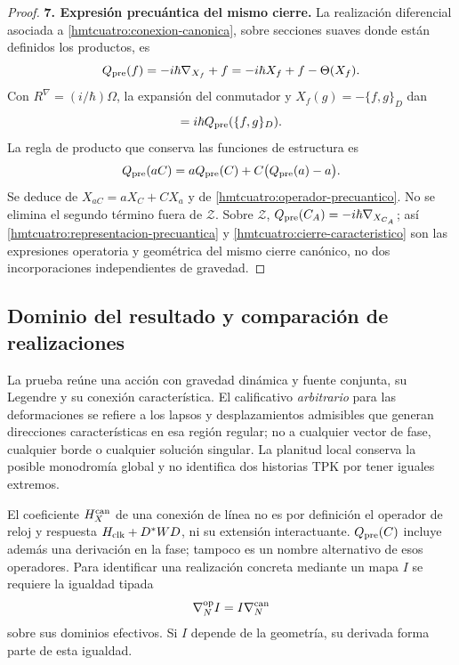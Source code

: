 \begin{proof}
\par\medskip\noindent\textbf{7. Expresión precuántica del mismo cierre.}\quad
La realización diferencial asociada a
\eqref{hmtcuatro:conexion-canonica}, sobre secciones suaves donde
están definidos los productos, es
\begin{equation}
 Q_{\rm pre}(f)=-i\hbar\nabla_{X_f}+f
            =-i\hbar X_f+f-\Theta(X_f).
 \label{hmtcuatro:operador-precuantico}
\end{equation}
Con \(R^\nabla=(i/\hbar)\Omega\), la expansión del conmutador y
\(X_f(g)=-\{f,g\}_D\) dan
\begin{equation}
 [Q_{\rm pre}(f),Q_{\rm pre}(g)]
           =i\hbar Q_{\rm pre}(\{f,g\}_D).
 \label{hmtcuatro:representacion-precuantica}
\end{equation}
La regla de producto que conserva las funciones de estructura es
\begin{equation}
 Q_{\rm pre}(aC)
   =aQ_{\rm pre}(C)+C\bigl(Q_{\rm pre}(a)-a\bigr).
 \label{hmtcuatro:funciones-estructura}
\end{equation}
Se deduce de \(X_{aC}=aX_C+CX_a\) y de
\eqref{hmtcuatro:operador-precuantico}. No se elimina el segundo
término fuera de \(\mathcal Z\).
Sobre \(\mathcal Z\), \(Q_{\rm pre}(C_A)=-i\hbar\nabla_{X_{C_A}}\);
así \eqref{hmtcuatro:representacion-precuantica} y
\eqref{hmtcuatro:cierre-caracteristico} son las expresiones operatoria
y geométrica del mismo cierre canónico, no dos incorporaciones
independientes de gravedad.
\end{proof}

\subsection{Dominio del resultado y comparación de realizaciones}
\label{hmtcuatro:alcance-canonico}

La prueba reúne una acción con gravedad dinámica y fuente conjunta,
su Legendre y su conexión característica. El calificativo
\emph{arbitrario} para las deformaciones se refiere a los lapsos y
desplazamientos admisibles que generan direcciones características en
esa región regular; no a cualquier vector de fase, cualquier borde
o cualquier solución singular. La planitud local conserva la posible
monodromía global y no identifica dos historias TPK por tener iguales
extremos.

El coeficiente \(H_X^{\rm can}\) de una conexión de línea no es por
definición el operador de reloj y respuesta \(H_{\rm clk}+D^*WD\),
ni su extensión interactuante. \(Q_{\rm pre}(C)\) incluye además
una derivación en la fase; tampoco es un nombre alternativo de esos
operadores. Para identificar una realización concreta mediante un
mapa \(I\) se requiere la igualdad tipada
\[
 \nabla_N^{\rm op}I=I\nabla_N^{\rm can}
\]
sobre sus dominios efectivos. Si \(I\) depende de la geometría, su
derivada forma parte de esta igualdad.

